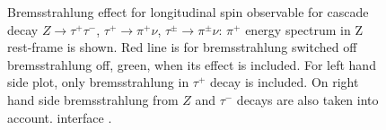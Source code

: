 \documentclass[]{Photos_interface_design}
\begin{document}
\begin{figure}[h!]
\centering
{}
\caption{ Bremsstrahlung effect for longitudinal spin observable
for cascade decay $Z \to \tau^+ \tau^-$, $\tau^+ \to \pi^+ \nu$,  $\tau^\pm \to \pi^\pm\nu$:
$\pi^+$ energy spectrum in Z rest-frame  is shown. Red line is for 
bremsstrahlung switched off
bremsstrahlung off, green, when its effect is included. 
For left hand side plot,  only  bremsstrahlung in  $\tau^+ $ decay is included.
On right hand side bremsstrahlung from $Z$ and  $\tau^-$ decays are
 also taken into account.
interface  \label{fig:KKMC}.
}
\end{figure}
\end{document}
